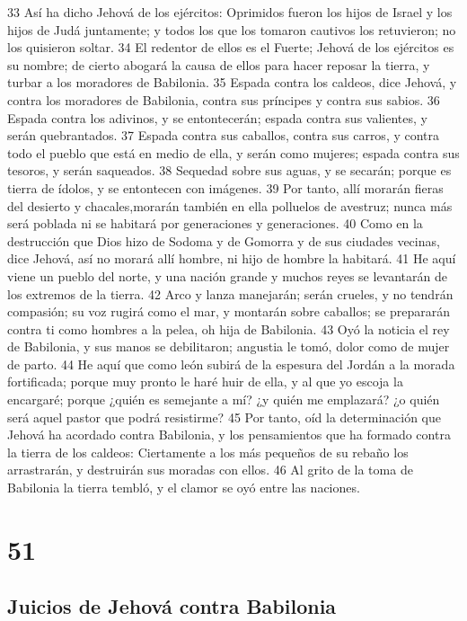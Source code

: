 33 Así ha dicho Jehová de los ejércitos: Oprimidos fueron los hijos de Israel y los hijos de Judá juntamente; y todos los que los tomaron cautivos los retuvieron; no los quisieron soltar.
34 El redentor de ellos es el Fuerte; Jehová de los ejércitos es su nombre; de cierto abogará la causa de ellos para hacer reposar la tierra, y turbar a los moradores de Babilonia.
35 Espada contra los caldeos, dice Jehová, y contra los moradores de Babilonia, contra sus príncipes y contra sus sabios.
36 Espada contra los adivinos, y se entontecerán; espada contra sus valientes, y serán quebrantados.
37 Espada contra sus caballos, contra sus carros, y contra todo el pueblo que está en medio de ella, y serán como mujeres; espada contra sus tesoros, y serán saqueados.
38 Sequedad sobre sus aguas, y se secarán; porque es tierra de ídolos, y se entontecen con imágenes.
39 Por tanto, allí morarán fieras del desierto y chacales,morarán también en ella polluelos de avestruz; nunca más será poblada ni se habitará por generaciones y generaciones.
40 Como en la destrucción que Dios hizo de Sodoma y de Gomorra y de sus ciudades vecinas, dice Jehová, así no morará allí hombre, ni hijo de hombre la habitará.
41 He aquí viene un pueblo del norte, y una nación grande y muchos reyes se levantarán de los extremos de la tierra.
42 Arco y lanza manejarán; serán crueles, y no tendrán compasión; su voz rugirá como el mar, y montarán sobre caballos; se prepararán contra ti como hombres a la pelea, oh hija de Babilonia.
43 Oyó la noticia el rey de Babilonia, y sus manos se debilitaron; angustia le tomó, dolor como de mujer de parto.
44 He aquí que como león subirá de la espesura del Jordán a la morada fortificada; porque muy pronto le haré huir de ella, y al que yo escoja la encargaré; porque ¿quién es semejante a mí? ¿y quién me emplazará? ¿o quién será aquel pastor que podrá resistirme?
45 Por tanto, oíd la determinación que Jehová ha acordado contra Babilonia, y los pensamientos que ha formado contra la tierra de los caldeos: Ciertamente a los más pequeños de su rebaño los arrastrarán, y destruirán sus moradas con ellos.
46 Al grito de la toma de Babilonia la tierra tembló, y el clamor se oyó entre las naciones.

\chapter{51}

\section*{Juicios de Jehová contra Babilonia}

